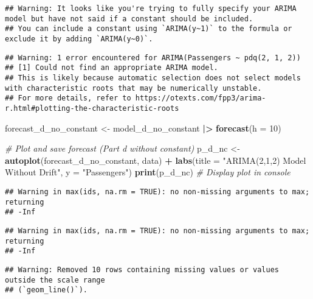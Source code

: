 \documentclass[
]{article}
\newenvironment{Shaded}{\begin{snugshade}}{\end{snugshade}}
\newcommand{\AttributeTok}[1]{\textcolor[rgb]{0.13,0.29,0.53}{#1}}
\newcommand{\CommentTok}[1]{\textcolor[rgb]{0.56,0.35,0.01}{\textit{#1}}}
\newcommand{\DecValTok}[1]{\textcolor[rgb]{0.00,0.00,0.81}{#1}}
\newcommand{\FunctionTok}[1]{\textcolor[rgb]{0.13,0.29,0.53}{\textbf{#1}}}
\newcommand{\NormalTok}[1]{#1}
\newcommand{\OtherTok}[1]{\textcolor[rgb]{0.56,0.35,0.01}{#1}}
\newcommand{\SpecialCharTok}[1]{\textcolor[rgb]{0.81,0.36,0.00}{\textbf{#1}}}
\newcommand{\StringTok}[1]{\textcolor[rgb]{0.31,0.60,0.02}{#1}}
\begin{document}
\begin{verbatim}
## Warning: It looks like you're trying to fully specify your ARIMA model but have not said if a constant should be included.
## You can include a constant using `ARIMA(y~1)` to the formula or exclude it by adding `ARIMA(y~0)`.
\end{verbatim}

\begin{verbatim}
## Warning: 1 error encountered for ARIMA(Passengers ~ pdq(2, 1, 2))
## [1] Could not find an appropriate ARIMA model.
## This is likely because automatic selection does not select models with characteristic roots that may be numerically unstable.
## For more details, refer to https://otexts.com/fpp3/arima-r.html#plotting-the-characteristic-roots
\end{verbatim}

\begin{Shaded}
\begin{Highlighting}[]
\NormalTok{forecast\_d\_no\_constant }\OtherTok{\textless{}{-}}\NormalTok{ model\_d\_no\_constant }\SpecialCharTok{|\textgreater{}} \FunctionTok{forecast}\NormalTok{(}\AttributeTok{h =} \DecValTok{10}\NormalTok{)}

\CommentTok{\# Plot and save forecast (Part d without constant)}
\NormalTok{p\_d\_nc }\OtherTok{\textless{}{-}} \FunctionTok{autoplot}\NormalTok{(forecast\_d\_no\_constant, data) }\SpecialCharTok{+}
  \FunctionTok{labs}\NormalTok{(}\AttributeTok{title =} \StringTok{"ARIMA(2,1,2) Model Without Drift"}\NormalTok{, }\AttributeTok{y =} \StringTok{"Passengers"}\NormalTok{)}
\FunctionTok{print}\NormalTok{(p\_d\_nc) }\CommentTok{\# Display plot in console}
\end{Highlighting}
\end{Shaded}

\begin{verbatim}
## Warning in max(ids, na.rm = TRUE): no non-missing arguments to max; returning
## -Inf
\end{verbatim}

\begin{verbatim}
## Warning in max(ids, na.rm = TRUE): no non-missing arguments to max; returning
## -Inf
\end{verbatim}

\begin{verbatim}
## Warning: Removed 10 rows containing missing values or values outside the scale range
## (`geom_line()`).
\end{verbatim}
\end{document}
